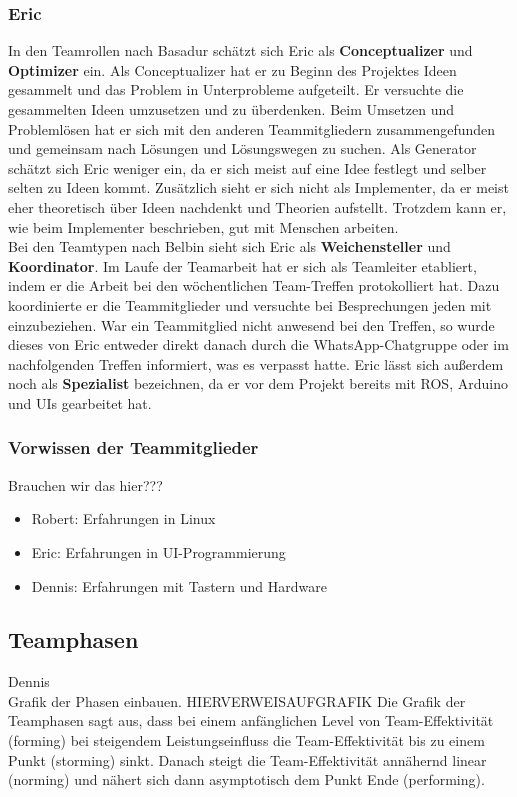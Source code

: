 \documentclass[a4paper,12pt,headsepline]{scrartcl}
\begin{document}
		\subsubsection{Eric}
		In den Teamrollen nach Basadur schätzt sich Eric als \textbf{Conceptualizer} und \textbf{Optimizer} ein. Als Conceptualizer hat er zu Beginn des Projektes Ideen gesammelt und das Problem in Unterprobleme aufgeteilt. Er versuchte die gesammelten Ideen umzusetzen und zu überdenken. Beim Umsetzen und Problemlösen hat er sich mit den anderen Teammitgliedern zusammengefunden und gemeinsam nach Lösungen und Lösungswegen zu suchen. Als Generator schätzt sich Eric weniger ein, da er sich meist auf eine Idee festlegt und selber selten zu Ideen kommt. Zusätzlich sieht er sich nicht als Implementer, da er meist eher theoretisch über Ideen nachdenkt und Theorien aufstellt. Trotzdem kann er, wie beim Implementer beschrieben, gut mit Menschen arbeiten.\\
		Bei den Teamtypen nach Belbin sieht sich Eric als \textbf{Weichensteller} und \textbf{Koordinator}. Im Laufe der Teamarbeit hat er sich als Teamleiter etabliert, indem er die Arbeit bei den wöchentlichen Team-Treffen protokolliert hat. Dazu koordinierte er die Teammitglieder und versuchte bei Besprechungen jeden mit einzubeziehen. War ein Teammitglied nicht anwesend bei den Treffen, so wurde dieses von Eric entweder direkt danach durch die WhatsApp-Chatgruppe oder im nachfolgenden Treffen informiert, was es verpasst hatte. Eric lässt sich außerdem noch als \textbf{Spezialist} bezeichnen, da er vor dem Projekt bereits mit ROS, Arduino und UIs gearbeitet hat.\\
		
	\subsubsection{Vorwissen der Teammitglieder}
		Brauchen wir das hier???
		\begin{itemize}
			\item Robert: Erfahrungen in Linux
			\item Eric: Erfahrungen in UI-Programmierung
			\item Dennis: Erfahrungen mit Tastern und Hardware
		\end{itemize}
	\subsection{Teamphasen}
		Dennis\\
		Grafik der Phasen einbauen. {HIERVERWEISAUFGRAFIK}
		Die Grafik der Teamphasen sagt aus, dass bei einem anfänglichen Level von Team-Effektivität (forming) bei steigendem Leistungseinfluss die Team-Effektivität bis zu einem Punkt (storming) sinkt. Danach steigt die Team-Effektivität annähernd linear (norming) und nähert sich dann asymptotisch dem Punkt Ende (performing). 
\end{document}
